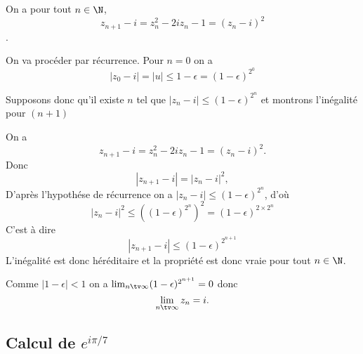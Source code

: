 \begin{correction}
On a pour tout $n\in \N$, 
$$z_{n+1} -i =z_n^2 -2iz_n-1= (z_n-i)^2$$. 

On va procéder par récurrence. Pour $n=0$ on a 
$$|z_0-i |=|u| \leq 1-\epsilon =(1-\epsilon)^{2^0}$$

Supposons donc qu'il existe $n$ tel que $|z_n-i|\leq (1-\epsilon)^{2^n}$  et montrons l'inégalité pour $(n+1)$


On a $$z_{n+1} - i = z_n^2-2iz_n-1 = (z_n -i)^2.$$
Donc 
$$|z_{n+1} - i | =| z_n -i|^2,$$
D'après l'hypothése de récurrence on a 
$| z_n -i| \leq (1-\epsilon)^{2^n}$, d'où
$$| z_n -i|^2 \leq \left((1-\epsilon)^{2^n}\right)^2 =(1-\epsilon)^{2\times 2^{n}}$$
C'est à dire 
$$|z_{n+1} - i | \leq (1-\epsilon)^{2^{n+1}}$$
L'inégalité est donc héréditaire et la propriété est donc vraie pour tout $n\in \N$.

Comme $|1-\epsilon|<1$ on a $\lim_{n\tv \infty}  (1-\epsilon)^{2^{n+1}}=0$ donc 
$$\lim_{n\tv \infty}  z_n = i.$$




\end{correction}




\subsection{Calcul de $e^{i\pi/7}$}

